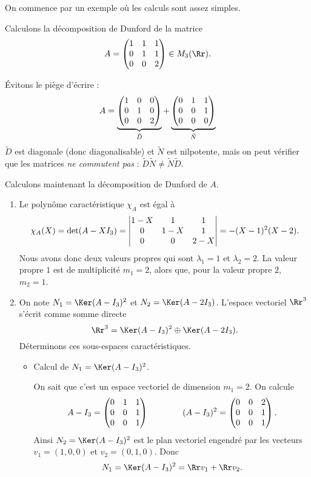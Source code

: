 \documentclass[12pt, class=report,crop=false]{standalone}
\begin{document}
On commence par un exemple où les calculs sont assez simples.
\begin{exemple}
Calculons la décomposition de Dunford de la matrice 
$$A=\begin{pmatrix}1&1&1\cr 0&1&1\cr 0&0&2\end{pmatrix} \in M_3(\Rr).$$


\'Evitons le piège d'écrire :
$$A=\underbrace{\begin{pmatrix}1&0&0\cr 0&1&0\cr 0&0&2\end{pmatrix}}_{\tilde D}
+\underbrace{\begin{pmatrix}0&1&1\cr 0&0&1\cr 0&0&0\end{pmatrix}}_{\tilde N}$$
$\tilde D$ est diagonale (donc diagonalisable) et $\tilde N$ est nilpotente,
mais on peut vérifier que les matrices \emph{ne commutent pas} :  
$\tilde D \tilde N \neq \tilde N \tilde D$.

\bigskip 
Calculons maintenant la décomposition de Dunford de $A$.

\begin{enumerate}
  \item Le polynôme caractéristique $\chi_A$ est égal à
$$\chi_A(X) 
= \det(A-XI_3) 
= \begin{vmatrix}1-X & 1 & 1\cr 0 & 1-X & 1\cr 0 & 0 & 2-X\end{vmatrix}
= -(X-1)^2(X-2).$$
Nous avons donc deux valeurs propres qui sont $\lambda_1 = 1$ et $\lambda_2 = 2$. 
La valeur propre $1$ est de multiplicité $m_1=2$, alors que, pour la valeur propre $2$, $m_2=1$.

  \item On note $N_1 = \Ker(A-I_3)^2$ et $N_2 = \Ker(A-2I_3)$. 
 L'espace vectoriel $\Rr^3$ s'écrit comme somme directe
$$\Rr^3=\Ker(A-I_3)^2\oplus\Ker(A-2I_3).$$
Déterminons ces sous-espaces caractéristiques. 
  \begin{itemize}
    \item Calcul de $N_1 = \Ker(A-I_3)^2$.
    
  On sait que c'est un espace vectoriel de dimension $m_1=2$. On calcule
$$A-I_3 = \begin{pmatrix}0&1&1\cr0&0&1\cr0&0&1\end{pmatrix}\qquad \qquad 
(A-I_3)^2 = \begin{pmatrix}0&0&2\cr0&0&1\cr0&0&1\end{pmatrix}.$$
Ainsi $N_2 = \Ker(A-I_3)^2$ est le plan vectoriel engendré par les vecteurs $v_1=(1,0,0)$ et $v_2=(0,1,0)$.
Donc 
$$N_1=\Ker(A-I_3)^2=\Rr v_1 + \Rr v_2.$$


\end{itemize}
\end{enumerate}
\end{exemple}
\end{document}
